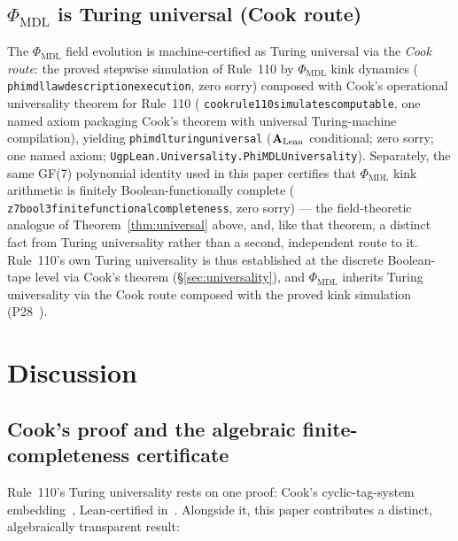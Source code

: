 \documentclass[11pt]{article}
\theoremstyle{remark}
\newcommand{\lean}[1]{%
  \penalty-100
  \begingroup\def\_{\textunderscore\allowbreak}\texttt{#1}\endgroup}
\newcommand{\CatAL}{\ensuremath{\textbf{A}_{\rm Lean}}}
\begin{document}
\subsection{\texorpdfstring{$\Phi_{\mathrm{MDL}}$}{Phi-MDL} is Turing universal (Cook route)}

The $\Phi_{\mathrm{MDL}}$ field evolution is machine-certified as Turing universal
via the \emph{Cook route}: the proved stepwise simulation of Rule~110 by
$\Phi_{\mathrm{MDL}}$ kink dynamics (\lean{phimdl\_law\_description\_execution},
zero sorry) composed with Cook's operational universality theorem for Rule~110
(\lean{cook\_rule110\_simulates\_computable}, one named axiom packaging Cook's
theorem with universal Turing-machine compilation), yielding
\lean{phimdl\_turing\_universal} ($\CatAL$ conditional; zero sorry; one named
axiom; \lean{UgpLean.Universality.\allowbreak{}PhiMDLUniversality}).
Separately, the same GF(7) polynomial identity used in this paper certifies that
$\Phi_{\mathrm{MDL}}$ kink arithmetic is finitely Boolean-functionally complete
(\lean{z7\_bool3\_finite\_functional\_completeness}, zero sorry) --- the field-theoretic
analogue of Theorem~\ref{thm:universal} above, and, like that theorem, a distinct
fact from Turing universality rather than a second, independent route to it.
Rule~110's own Turing universality is thus established at the discrete Boolean-tape
level via Cook's theorem (\S\ref{sec:universality}), and $\Phi_{\mathrm{MDL}}$
inherits Turing universality via the Cook route composed with the proved kink
simulation (P28~\cite{SpivackCompUniversality}).

\section{Discussion}
\label{sec:discussion}

\subsection{Cook's proof and the algebraic finite-completeness certificate}

Rule~110's Turing universality rests on one proof: Cook's cyclic-tag-system
embedding~\cite{Cook2004}, Lean-certified in~\cite{SpivackCookTheorem,rule110-lean}.
Alongside it, this paper contributes a distinct, algebraically transparent result:
\end{document}
